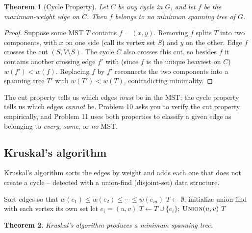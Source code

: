 \documentclass[11pt]{article}
\newtheorem{theorem}{Theorem}[section]
\begin{document}
\begin{theorem}[Cycle Property]
\label{thm:cycle}
Let $C$ be any cycle in $G$, and let $f$ be the \emph{maximum-weight} edge on
$C$. Then $f$ belongs to \emph{no} minimum spanning tree of $G$.
\end{theorem}

\begin{proof}
Suppose some MST $T$ contains $f = (x,y)$. Removing $f$ splits $T$ into two
components, with $x$ on one side (call its vertex set $S$) and $y$ on the other.
Edge $f$ crosses the cut $(S, V \setminus S)$. The cycle $C$ also crosses this
cut, so besides $f$ it contains another crossing edge $f'$ with (since $f$ is the
unique heaviest on $C$) $w(f') < w(f)$. Replacing $f$ by $f'$ reconnects the two
components into a spanning tree $T'$ with $w(T') < w(T)$, contradicting
minimality.
\end{proof}

The cut property tells us which edges \emph{must} be in the MST; the cycle
property tells us which edges \emph{cannot} be. Problem 10 asks you to verify the
cut property empirically, and Problem 11 uses both properties to classify a given
edge as belonging to \emph{every}, \emph{some}, or \emph{no} MST.

\subsection{Kruskal's algorithm}

Kruskal's algorithm sorts the edges by weight and adds each one that does not
create a cycle -- detected with a union-find (disjoint-set) data structure.

\begin{algorithm}[h]
\caption{Kruskal's Minimum Spanning Tree}
\begin{algorithmic}[1]
\State Sort edges so that $w(e_1) \le w(e_2) \le \cdots \le w(e_m)$
\State $T \gets \emptyset$; \quad initialize union-find with each vertex its own set
    \State let $e_i = (u, v)$
     
        \State $T \gets T \cup \{e_i\}$; \quad $\textsc{Union}(u, v)$
    \EndIf
\EndFor
\State \Return $T$
\end{algorithmic}
\end{algorithm}

\begin{theorem}
Kruskal's algorithm produces a minimum spanning tree.
\end{theorem}
\end{document}
